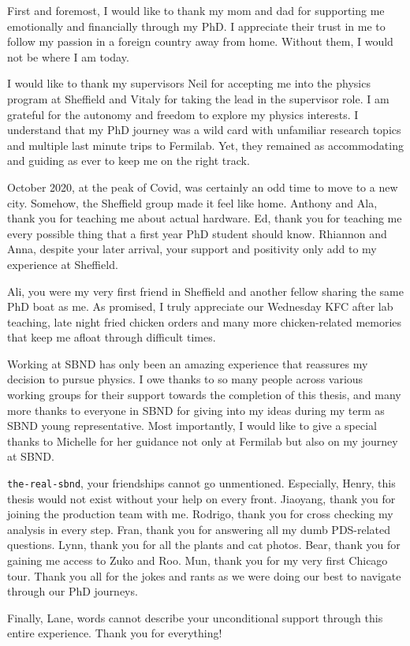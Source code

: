 
\begin{acknowledgements}     
First and foremost, I would like to thank my mom and dad for supporting me emotionally and financially through my PhD.
I appreciate their trust in me to follow my passion in a foreign country away from home.
Without them, I would not be where I am today.

I would like to thank my supervisors Neil for accepting me into the physics program at Sheffield and Vitaly for taking the lead in the supervisor role.
I am grateful for the autonomy and freedom to explore my physics interests.
I understand that my PhD journey was a wild card with unfamiliar research topics and multiple last minute trips to Fermilab. 
Yet, they remained as accommodating and guiding as ever to keep me on the right track.

October 2020, at the peak of Covid, was certainly an odd time to move to a new city.
Somehow, the Sheffield group made it feel like home.                                  
Anthony and Ala, thank you for teaching me about actual hardware.
Ed, thank you for teaching me every possible thing that a first year PhD student should know.
Rhiannon and Anna, despite your later arrival, your support and positivity only add to my experience at Sheffield.

Ali, you were my very first friend in Sheffield and another fellow sharing the same PhD boat as me.   
As promised, I truly appreciate our Wednesday KFC after lab teaching, late night fried chicken orders and many more chicken-related memories that keep me afloat through difficult times.
                                                                                                                            
Working at SBND has only been an amazing experience that reassures my decision to pursue physics.
I owe thanks to so many people across various working groups for their support towards the completion of this thesis, and many more thanks to everyone in SBND for giving into my ideas during my term as SBND young representative.
Most importantly, I would like to give a special thanks to Michelle for her guidance not only at Fermilab but also on my journey at SBND.

\texttt{the-real-sbnd}, your friendships cannot go unmentioned.
Especially, Henry, this thesis would not exist without your help on every front.
Jiaoyang, thank you for joining the production team with me.
Rodrigo, thank you for cross checking my analysis in every step.
Fran, thank you for answering all my dumb PDS-related questions.
Lynn, thank you for all the plants and cat photos.
Bear, thank you for gaining me access to Zuko and Roo.
Mun, thank you for my very first Chicago tour.
Thank you all for the jokes and rants as we were doing our best to navigate through our PhD journeys.

Finally, Lane, words cannot describe your unconditional support through this entire experience.
Thank you for everything!                                                                                                                                       
\end{acknowledgements}
